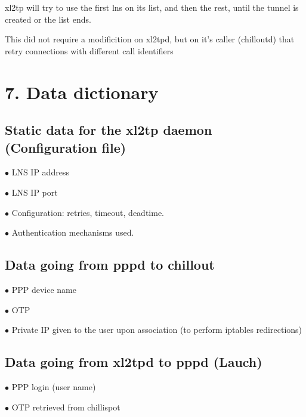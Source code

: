 xl2tp will try to use the first lns on its list, and then the rest, until
the tunnel is created or the list ends.

This did not require a modificition on xl2tpd, but on it's caller (chilloutd)
that retry connections with different call identifiers



\section{7. Data dictionary}

\subsection{Static data for the xl2tp daemon (Configuration file)}
 \item {$\bullet$} LNS IP address
 \item {$\bullet$} LNS IP port
 \item {$\bullet$} Configuration: retries, timeout, deadtime.
 \item {$\bullet$} Authentication mechanisms used.

\subsection{Data going from pppd to chillout}
 \item {$\bullet$} PPP device name
 \item {$\bullet$} OTP
 \item {$\bullet$} Private IP given to the user upon association (to perform
   iptables redirections)

\subsection{Data going from xl2tpd to pppd (Lauch)}
 \item {$\bullet$} PPP login (user name)
 \item {$\bullet$} OTP retrieved from chillispot

